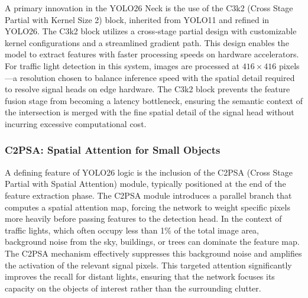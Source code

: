 A primary innovation in the YOLO26 Neck is the use of the C3k2 (Cross Stage Partial with Kernel Size 2) block, inherited from YOLO11 and refined in YOLO26. The C3k2 block utilizes a cross-stage partial design with customizable kernel configurations and a streamlined gradient path. This design enables the model to extract features with faster processing speeds on hardware accelerators. For traffic light detection in this system, images are processed at $416 \times 416$ pixels—a resolution chosen to balance inference speed with the spatial detail required to resolve signal heads on edge hardware. The C3k2 block prevents the feature fusion stage from becoming a latency bottleneck, ensuring the semantic context of the intersection is merged with the fine spatial detail of the signal head without incurring excessive computational cost.

\subsubsection{C2PSA: Spatial Attention for Small Objects}

A defining feature of YOLO26 logic is the inclusion of the C2PSA (Cross Stage Partial with Spatial Attention) module, typically positioned at the end of the feature extraction phase. The C2PSA module introduces a parallel branch that computes a spatial attention map, forcing the network to weight specific pixels more heavily before passing features to the detection head. In the context of traffic lights, which often occupy less than 1\% of the total image area, background noise from the sky, buildings, or trees can dominate the feature map. The C2PSA mechanism effectively suppresses this background noise and amplifies the activation of the relevant signal pixels. This targeted attention significantly improves the recall for distant lights, ensuring that the network focuses its capacity on the objects of interest rather than the surrounding clutter.



